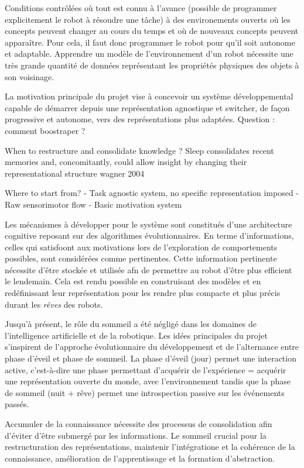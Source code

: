 \documentclass[draft]{llncs}
\begin{document}
Conditions contrôlées où tout est connu à l'avance (possible de programmer explicitement le robot à résoudre une tâche) à des environements ouverts où les concepts peuvent changer au cours du temps et où de nouveaux concepts peuvent apparaître.
Pour cela, il faut donc programmer le robot pour qu'il soit autonome et adaptable.
Apprendre un modèle de l'environnement d'un robot nécessite une très grande quantité de données représentant les propriétés physiques des objets à son voisinage.

La motivation principale du projet vise à concevoir un système développemental capable de démarrer depuis une représentation agnostique et switcher, de façon progressive et autonome, vers des représentations plus adaptées. Question : comment boostraper ?


When to restructure and consolidate knowledge ?
Sleep consolidates recent memories and, concomitantly, could allow insight by changing their representational structure wagner 2004


Where to start from?
- Task agnostic system, no specific representation imposed
- Raw sensorimotor flow
- Basic motivation system

Les mécanismes à développer pour le système sont constitués d'une architecture cognitive reposant sur des algorithmes évolutionnaires. 
En terme d'informations, celles qui satisfoont aux motivations lors de l'exploration de comportements possibles, sont considérées comme pertinentes.
Cette information pertinente nécessite d'être stockée et utilisée afn de permettre au robot d'être plus efficient le lendemain.
Cela est rendu possible en construisant des modèles et en redéfinissant leur représentation pour les rendre plus compacte et plus précis durant les \textit{rêves} des robots.

Jusqu'à présent, le rôle du sommeil a été négligé dans les domaines de l'intelligence artificielle et de la robotique.
Les idées principales du projet s'inspirent de l'approche évolutionnaire du développement et de l'alternance entre phase d'éveil et phase de sommeil.
La phase d'éveil (jour) permet une interaction active, c'est-à-dire une phase permettant d'acquérir de l'expérience = acquérir une représentation ouverte du monde, avec l'environnement 
tandis que la phase de sommeil (nuit + rêve) permet une introspection passive sur les événements passés.

Accumuler de la connaissance nécessite des processus de consolidation afin d'éviter d'être submergé par les informations.
Le sommeil crucial pour la restructuration des représentations, maintenir l'intégratione et la cohérence de la connaissance, amélioration de l'apprentissage et la formation d'abstraction.
\end{document}
